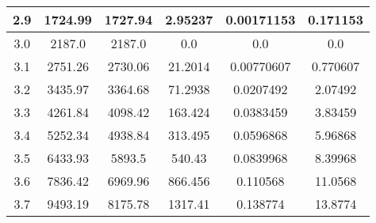 \begin{table}[h!]
\begin{tabular}{|c|c|c|c|c|c|}
        2.9        & 1724.99        & 1727.94                                      & 2.95237      & 0.00171153        & 0.171153          \\ \hline
        3.0        & 2187.0         & 2187.0                                       & 0.0          & 0.0               & 0.0               \\ \hline
        3.1        & 2751.26        & 2730.06                                      & 21.2014      & 0.00770607        & 0.770607          \\ \hline
        3.2        & 3435.97        & 3364.68                                      & 71.2938      & 0.0207492         & 2.07492           \\ \hline
        3.3        & 4261.84        & 4098.42                                      & 163.424      & 0.0383459         & 3.83459           \\ \hline
        3.4        & 5252.34        & 4938.84                                      & 313.495      & 0.0596868         & 5.96868           \\ \hline
        3.5        & 6433.93        & 5893.5                                       & 540.43       & 0.0839968         & 8.39968           \\ \hline
        3.6        & 7836.42        & 6969.96                                      & 866.456      & 0.110568          & 11.0568           \\ \hline
        3.7        & 9493.19        & 8175.78                                      & 1317.41      & 0.138774          & 13.8774           \\ \hline
    \end{tabular}\label{tab:table6}
\end{table}
